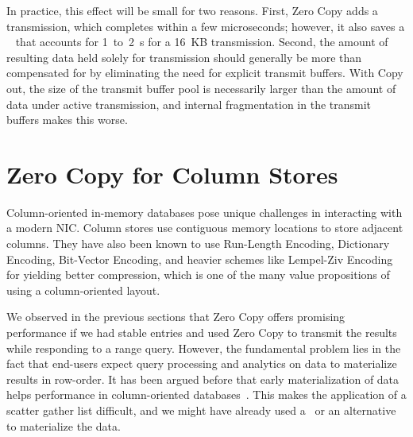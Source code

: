 In practice, this effect will be small for two reasons. First, Zero Copy adds a
transmission, which completes within a few microseconds; however, it also saves a
\memcpy~ that accounts for 1~to~2~\textmu s for a 16~KB transmission. Second, the
amount of resulting data held solely for transmission should generally be
more than compensated for by eliminating the need for explicit transmit
buffers. With Copy out, the size of the transmit buffer pool is necessarily
larger than the amount of data under active transmission, and internal
fragmentation in the transmit buffers makes this worse.


\section{Zero Copy for Column Stores}

Column-oriented in-memory databases pose unique challenges in interacting with a modern NIC. 
Column stores use contiguous memory locations to store adjacent columns. They have also been known 
to use Run-Length Encoding, Dictionary Encoding, Bit-Vector Encoding, and heavier schemes 
like Lempel-Ziv Encoding for yielding better compression, which is one of the many value 
propositions of using a column-oriented layout. 

We observed in the previous  sections that Zero Copy offers promising performance if 
we had stable entries and used Zero Copy to transmit the results while responding to a range query. 
However, the fundamental problem lies in the fact that end-users expect query processing and analytics on data 
to materialize results in row-order. It has been argued before that early materialization of data
helps performance in column-oriented databases~\cite{cstore-material}. This makes the application 
of a scatter gather list difficult, and we might have already used a \memcpy ~or an alternative 
to materialize the data. 


